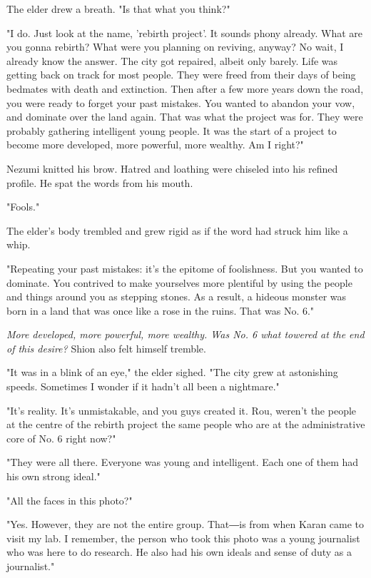 The elder drew a breath. "Is that what you think?"

"I do. Just look at the name, 'rebirth project'. It sounds phony
already. What are you gonna rebirth? What were you planning on reviving,
anyway? No wait, I already know the answer. The city got repaired,
albeit only barely. Life was getting back on track for most people. They
were freed from their days of being bedmates with death and extinction.
Then after a few more years down the road, you were ready to forget your
past mistakes. You wanted to abandon your vow, and dominate over the
land again. That was what the project was for. They were probably
gathering intelligent young people. It was the start of a project to
become more developed, more powerful, more wealthy. Am I right?"

Nezumi knitted his brow. Hatred and loathing were chiseled into his
refined profile. He spat the words from his mouth.

"Fools."

The elder's body trembled and grew rigid as if the word had struck him
like a whip.

"Repeating your past mistakes: it's the epitome of foolishness. But you
wanted to dominate. You contrived to make yourselves more plentiful by
using the people and things around you as stepping stones. As a result,
a hideous monster was born in a land that was once like a rose in the
ruins. That was No. 6."

\emph{More developed, more powerful, more wealthy. Was No. 6 what towered at
	the end of this desire?} Shion also felt himself tremble.

"It was in a blink of an eye," the elder sighed. "The city grew at
astonishing speeds. Sometimes I wonder if it hadn't all been a
nightmare."

"It's reality. It's unmistakable, and you guys created it. Rou, weren't
the people at the centre of the rebirth project the same people who are
at the administrative core of No. 6 right now?"

"They were all there. Everyone was young and intelligent. Each one of
them had his own strong ideal."

"All the faces in this photo?"

"Yes. However, they are not the entire group. That―is from when Karan
came to visit my lab. I remember, the person who took this photo was a
young journalist who was here to do research. He also had his own ideals
and sense of duty as a journalist."


